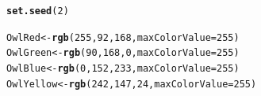 \documentclass{article}\usepackage[]{graphicx}\usepackage[]{color}
\makeatletter
\newcommand{\hlnum}[1]{\textcolor[rgb]{0.686,0.059,0.569}{#1}}%
\newcommand{\hlstd}[1]{\textcolor[rgb]{0.345,0.345,0.345}{#1}}%
\newcommand{\hlkwb}[1]{\textcolor[rgb]{0.69,0.353,0.396}{#1}}%
\newcommand{\hlkwc}[1]{\textcolor[rgb]{0.333,0.667,0.333}{#1}}%
\newcommand{\hlkwd}[1]{\textcolor[rgb]{0.737,0.353,0.396}{\textbf{#1}}}%
\newenvironment{kframe}{%
 \def\at@end@of@kframe{}%
 \ifinner\ifhmode%
  \def\at@end@of@kframe{\end{minipage}}%
  \begin{minipage}{\columnwidth}%
 \fi\fi%
 \def\FrameCommand##1{\hskip\@totalleftmargin \hskip-\fboxsep
 \colorbox{shadecolor}{##1}\hskip-\fboxsep
     \hskip-\linewidth \hskip-\@totalleftmargin \hskip\columnwidth}%
 \MakeFramed {\advance\hsize-\width
   \@totalleftmargin\z@ \linewidth\hsize
   \@setminipage}}%
 {\par\unskip\endMakeFramed%
 \at@end@of@kframe}
\newenvironment{knitrout}{}{} %
\makeatother
\begin{document}


\begin{knitrout}
\color{fgcolor}\begin{kframe}
\begin{alltt}
\hlkwd{set.seed}\hlstd{(}\hlnum{2}\hlstd{)}

\hlstd{OwlRed} \hlkwb{<-} \hlkwd{rgb}\hlstd{(}\hlnum{255}\hlstd{,}  \hlnum{92}\hlstd{,} \hlnum{168}\hlstd{,} \hlkwc{maxColorValue} \hlstd{=} \hlnum{255}\hlstd{)}
\hlstd{OwlGreen} \hlkwb{<-} \hlkwd{rgb}\hlstd{(}\hlnum{90}\hlstd{,} \hlnum{168}\hlstd{,}   \hlnum{0}\hlstd{,} \hlkwc{maxColorValue} \hlstd{=} \hlnum{255}\hlstd{)}
\hlstd{OwlBlue} \hlkwb{<-} \hlkwd{rgb}\hlstd{(} \hlnum{0}\hlstd{,} \hlnum{152}\hlstd{,} \hlnum{233}\hlstd{,} \hlkwc{maxColorValue} \hlstd{=} \hlnum{255}\hlstd{)}
\hlstd{OwlYellow} \hlkwb{<-} \hlkwd{rgb}\hlstd{(} \hlnum{242}\hlstd{,} \hlnum{147}\hlstd{,}  \hlnum{24}\hlstd{,} \hlkwc{maxColorValue} \hlstd{=} \hlnum{255}\hlstd{)}
\end{alltt}
\end{kframe}
\end{knitrout}
\end{document}
